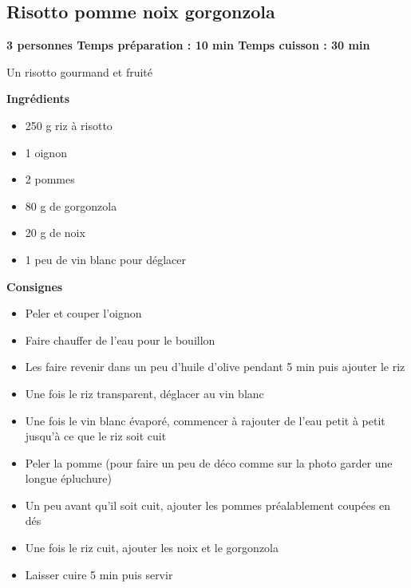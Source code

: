 \documentclass[]{book}
\providecommand{\tightlist}{%
  \setlength{\itemsep}{0pt}\setlength{\parskip}{0pt}}
\begin{document}
\hypertarget{risotto-pomme-noix-gorgonzola}{%
\subsection*{\texorpdfstring{{Risotto pomme noix gorgonzola}}{Risotto pomme noix gorgonzola}}\label{risotto-pomme-noix-gorgonzola}}

\begin{salebox}
\textbf{3 personnes \textbar{} Temps préparation : 10 min \textbar{}
Temps cuisson : 30 min}

Un risotto gourmand et fruité
\end{salebox}

\textbf{Ingrédients}

\begin{itemize}
\tightlist
\item
  250 g riz à risotto
\item
  1 oignon
\item
  2 pommes
\item
  80 g de gorgonzola
\item
  20 g de noix
\item
  1 peu de vin blanc pour déglacer
\end{itemize}

\textbf{Consignes}

\begin{itemize}
\tightlist
\item
  Peler et couper l'oignon
\item
  Faire chauffer de l'eau pour le bouillon
\item
  Les faire revenir dans un peu d'huile d'olive pendant 5 min puis ajouter le riz
\item
  Une fois le riz transparent, déglacer au vin blanc
\item
  Une fois le vin blanc évaporé, commencer à rajouter de l'eau petit à petit jusqu'à ce que le riz soit cuit
\item
  Peler la pomme (pour faire un peu de déco comme sur la photo garder une longue épluchure)
\item
  Un peu avant qu'il soit cuit, ajouter les pommes préalablement coupées en dés
\item
  Une fois le riz cuit, ajouter les noix et le gorgonzola
\item
  Laisser cuire 5 min puis servir
\end{itemize}
\end{document}
